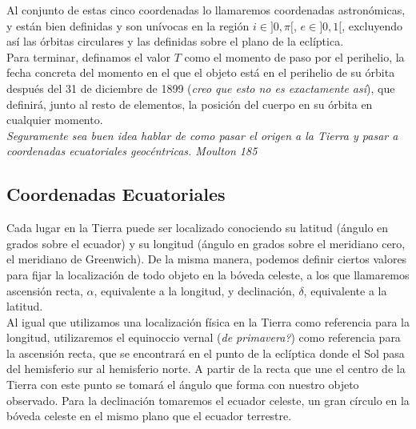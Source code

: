 \documentclass[11pt]{article}
\begin{document}
Al conjunto de estas cinco coordenadas lo llamaremos coordenadas astronómicas, y están bien definidas y son unívocas en la región $i\in]0,\pi[$, $e\in]0,1[$, excluyendo así las órbitas circulares y las definidas sobre el plano de la eclíptica.\\

Para terminar, definamos el valor $T$ como el momento de paso por el perihelio, la fecha concreta del momento en el que el objeto está en el perihelio de su órbita después del 31 de diciembre de 1899 (\textit{creo que esto no es exactamente así}), que definirá, junto al resto de elementos, la posición del cuerpo en su órbita en cualquier momento.\\

\noindent \textit{Seguramente sea buen idea hablar de como pasar el origen a la Tierra y pasar a coordenadas ecuatoriales geocéntricas. Moulton 185}\\


\subsection{Coordenadas Ecuatoriales}
Cada lugar en la Tierra puede ser localizado conociendo su latitud (ángulo en grados sobre el ecuador) y su longitud (ángulo en grados sobre el meridiano cero, el meridiano de Greenwich). De la misma manera, podemos definir ciertos valores para fijar la localización de todo objeto en la bóveda celeste, a los que llamaremos ascensión recta, $\alpha$, equivalente a la longitud, y declinación, $\delta$, equivalente a la latitud. \\

Al igual que utilizamos una localización física en la Tierra como referencia para la longitud, utilizaremos el equinoccio vernal (\textit{de primavera?}) como referencia para la ascensión recta, que se encontrará en el punto de la eclíptica donde el Sol pasa del hemisferio sur al hemisferio norte. A partir de la recta que une el centro de la Tierra con este punto se tomará el ángulo que forma con nuestro objeto observado. Para la declinación tomaremos el ecuador celeste, un gran círculo en la bóveda celeste en el mismo plano que el ecuador terrestre.\\
\end{document}
